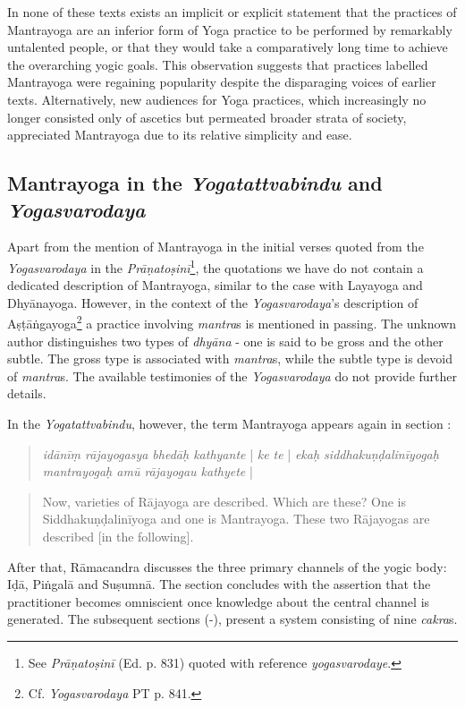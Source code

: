  In none of these texts exists an implicit or explicit statement that the practices of Mantrayoga are an inferior form of Yoga practice to be performed by remarkably untalented people, or that they would take a comparatively long time to achieve the overarching yogic goals. This observation suggests that practices labelled Mantrayoga were regaining popularity despite the disparaging voices of earlier texts. Alternatively, new audiences for Yoga practices, which increasingly no longer consisted only of ascetics but permeated broader strata of society, appreciated Mantrayoga due to its relative simplicity and ease.  

\subsection{Mantrayoga in the \textit{Yogatattvabindu} and \textit{Yogasvarodaya}}
\label{bindumantra}
Apart from the mention of Mantrayoga in the initial verses quoted from the \textit{Yogasvarodaya} in the \textit{Prāṇatoṣinī}\footnote{See \emph{Prāṇatoṣinī} (Ed. p. 831) quoted with reference \textit{yogasvarodaye}.}, the quotations we have do not contain a dedicated description of Mantrayoga, similar to the case with Layayoga and Dhyānayoga. However, in the context of the \emph{Yogasvarodaya}'s description of Aṣṭāṅgayoga\footnote{Cf. \emph{Yogasvarodaya} PT p. 841.} a practice involving \textit{mantra}s is mentioned in passing. The unknown author distinguishes two types of \textit{dhyāna} - one is said to be gross and the other subtle. The gross type is associated with \textit{mantra}s, while the subtle type is devoid of  \textit{mantra}s. The available testimonies of the \emph{Yogasvarodaya} do not provide further details.  

In the \textit{Yogatattvabindu}, however, the term Mantrayoga appears again in section :

\begin{quote}
  \textit{idānīṃ rājayogasya bhedāḥ kathyante} | \textit{ke te} | \textit{ekaḥ siddhakuṇḍalinīyogaḥ mantrayogaḥ amū rājayogau kathyete} |
\end{quote}
\begin{quote}
  Now, varieties of Rājayoga are described. Which are these? One is Siddhakuṇḍalinīyoga and one is Mantrayoga. These two Rājayogas are described [in the following].
\end{quote}

After that, Rāmacandra discusses the three primary channels of the yogic body: Iḍā, Piṅgalā and Suṣumnā. The section concludes with the assertion that the practitioner becomes omniscient once knowledge about the central channel is generated. The subsequent sections (-), present a system consisting of nine \textit{cakra}s.

